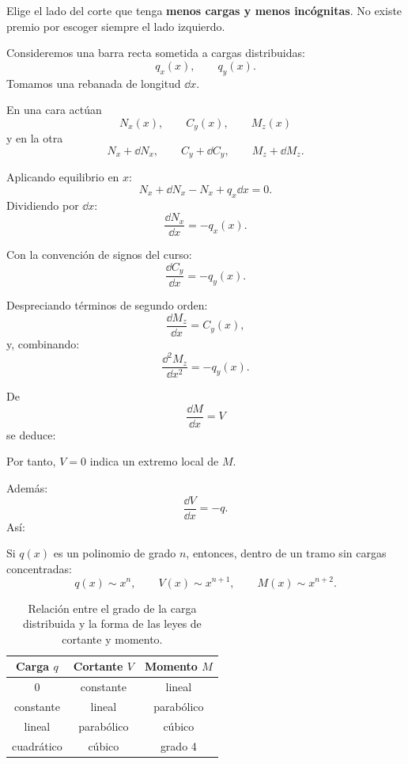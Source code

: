 \begin{tip}
Elige el lado del corte que tenga \textbf{menos cargas y menos incógnitas}. No existe premio por escoger siempre el lado izquierdo.
\end{tip}


Consideremos una barra recta sometida a cargas distribuidas:
\[
q_x(x),\qquad q_y(x).
\]
Tomamos una rebanada de longitud $\dd x$.

En una cara actúan
\[
N_x(x),\qquad C_y(x),\qquad M_z(x)
\]
y en la otra
\[
N_x+\dd N_x,\qquad C_y+\dd C_y,\qquad M_z+\dd M_z.
\]

Aplicando equilibrio en $x$:
\[
N_x+\dd N_x-N_x+q_x\dd x=0.
\]
Dividiendo por $\dd x$:
\[
\frac{\dd N_x}{\dd x}=-q_x(x).
\]

Con la convención de signos del curso:
\[
\frac{\dd C_y}{\dd x}=-q_y(x).
\]

Despreciando términos de segundo orden:
\[
\frac{\dd M_z}{\dd x}=C_y(x),
\]
y, combinando:
\[
\frac{\dd^2M_z}{\dd x^2}=-q_y(x).
\]

De
\[
\frac{\dd M}{\dd x}=V
\]
se deduce:

Por tanto, $V=0$ indica un extremo local de $M$.

Además:
\[
\frac{\dd V}{\dd x}=-q.
\]
Así:

Si $q(x)$ es un polinomio de grado $n$, entonces, dentro de un tramo sin cargas concentradas:
\[
q(x)\sim x^n,
\qquad
V(x)\sim x^{n+1},
\qquad
M(x)\sim x^{n+2}.
\]

\begin{table}[htbp]
\centering
\caption{Relación entre el grado de la carga distribuida y la forma de las leyes de cortante y momento.}
\label{tab:regla-grados-qvm}
\begin{tabular}{ccc}
\toprule
Carga $q$ & Cortante $V$ & Momento $M$\\
\midrule
$0$ & constante & lineal\\
constante & lineal & parabólico\\
lineal & parabólico & cúbico\\
cuadrático & cúbico & grado 4\\
\bottomrule
\end{tabular}
\end{table}

